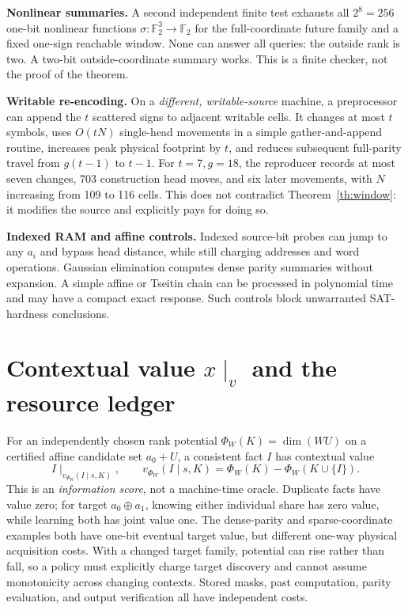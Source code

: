 \documentclass[10pt]{article}
\newcommand{\F}{\mathbb F_2}
\begin{document}
\noindent\textbf{Nonlinear summaries.} A second independent finite test exhausts all $2^8=256$ one-bit nonlinear functions $\sigma:\F^3\to\F$ for the full-coordinate future family and a fixed one-sign reachable window. None can answer all queries: the outside rank is two. A two-bit outside-coordinate summary works. This is a finite checker, not the proof of the theorem.

\noindent\textbf{Writable re-encoding.} On a \emph{different, writable-source} machine, a preprocessor can append the $t$ scattered signs to adjacent writable cells. It changes at most $t$ symbols, uses $O(tN)$ single-head movements in a simple gather-and-append routine, increases peak physical footprint by $t$, and reduces subsequent full-parity travel from $g(t-1)$ to $t-1$. For $t=7,g=18$, the reproducer records at most seven changes, 703 construction head moves, and six later movements, with $N$ increasing from 109 to 116 cells. This does not contradict Theorem~\ref{th:window}: it modifies the source and explicitly pays for doing so.

\noindent\textbf{Indexed RAM and affine controls.} Indexed source-bit probes can jump to any $a_i$ and bypass head distance, while still charging addresses and word operations. Gaussian elimination computes dense parity summaries without expansion. A simple affine or Tseitin chain can be processed in polynomial time and may have a compact exact response. Such controls block unwarranted SAT-hardness conclusions.

\section{Contextual value $x\mid_v$ and the resource ledger}
For an independently chosen rank potential $\Phi_W(K)=\dim(WU)$ on a certified affine candidate set $a_0+U$, a consistent fact $I$ has contextual value
\[I\mid_{v_{\Phi_W}(I\mid s,K)},\qquad v_{\Phi_W}(I\mid s,K)=\Phi_W(K)-\Phi_W(K\cup\{I\}).\]
This is an \emph{information score}, not a machine-time oracle. Duplicate facts have value zero; for target $a_0\oplus a_1$, knowing either individual share has zero value, while learning both has joint value one. The dense-parity and sparse-coordinate examples both have one-bit eventual target value, but different one-way physical acquisition costs. With a changed target family, potential can rise rather than fall, so a policy must explicitly charge target discovery and cannot assume monotonicity across changing contexts. Stored masks, past computation, parity evaluation, and output verification all have independent costs.
\end{document}
